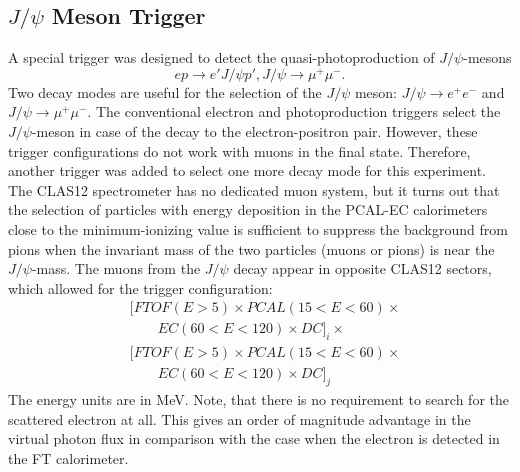 \subsection{$J/\psi$ Meson Trigger}
\label{sec:meson_trigger}
A special trigger was designed to detect the quasi-photoproduction of $J/\psi$-mesons
$$
ep \to e' J/\psi p', J/\psi \to \mu^+\mu^-.
$$
Two decay modes are useful for the selection of the $J/\psi$ meson: $J/\psi \to e^+e^-$ and $J/\psi \to \mu^+\mu^-$.
The conventional electron and photoproduction triggers  select the $J/\psi$-meson  in case of the decay to the electron-positron pair. However, these trigger configurations do not  work  with muons in the final state. Therefore, another trigger was added to select one more decay mode for this experiment. The CLAS12 spectrometer has no dedicated muon system, but it turns out that the selection of particles with energy deposition in the PCAL-EC calorimeters close to the minimum-ionizing  value is sufficient to suppress the background from pions when the invariant mass of the two particles (muons or pions) is near the $J/\psi$-mass. The muons from the $J/\psi$ decay appear in opposite CLAS12 sectors, which allowed for the trigger configuration:  
\begin{align*} 
 & [FTOF(E{{>}}5){\times}  PCAL(15{<}E{<}60){\times} \\
 & {\qquad} EC(60{<}E{<}120){\times}   DC]_i {\times} \\
 & [FTOF(E{{>}}5){\times}  PCAL(15{<}E{<}60){\times} \\
 & {\qquad} EC(60{<}E{<}120){\times}   DC]_j  
\end{align*}
\noindent
The energy units are in MeV. Note, that there is no requirement to search for the scattered electron at all. This gives an order of magnitude advantage in the  virtual photon flux in comparison with the case when the electron is detected in the FT calorimeter.
